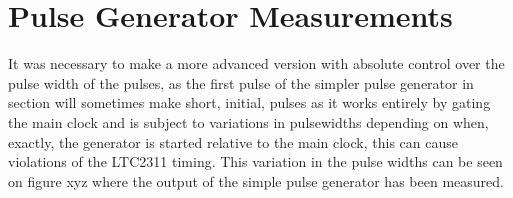 \chapter{Pulse Generator Measurements} \label{App:PulseGenTest}
It was necessary to make a more advanced version with absolute control over the pulse width of the pulses, as the first pulse of the simpler pulse generator in section  will sometimes make short, initial, pulses as it works entirely by gating the main clock and is subject to variations in pulsewidths depending on when, exactly, the generator is started relative to the main clock, this can cause violations of the LTC2311 timing. This variation in the pulse widths can be seen on figure xyz where the output of the simple pulse generator has been measured.
